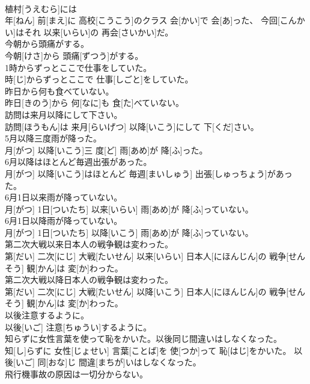 \documentclass[8pt]{extreport}
\begin{document}
\begin{CJK}{UTF8}{min}
\\	植村[うえむら]には 
\\	年[ねん] 前[まえ]に 高校[こうこう]のクラス 会[かい]で 会[あ]った、 今回[こんかい]はそれ 以来[いらい]の 再会[さいかい]だ。
\\	今朝から頭痛がする。	
\\	今朝[けさ]から 頭痛[ずつう]がする。
\\	1時からずっとここで仕事をしていた。	
\\	時[じ]からずっとここで 仕事[しごと]をしていた。
\\	昨日から何も食べていない。	
\\	昨日[きのう]から 何[なに]も 食[た]べていない。
\\	訪問は来月以降にして下さい。	
\\	訪問[ほうもん]は 来月[らいげつ] 以降[いこう]にして 下[くだ]さい。
\\	5月以降三度雨が降った。	
\\	月[がつ] 以降[いこう]三 度[ど] 雨[あめ]が 降[ふ]った。
\\	6月以降はほとんど毎週出張があった。	
\\	月[がつ] 以降[いこう]はほとんど 毎週[まいしゅう] 出張[しゅっちょう]があった。
\\	6月1日以来雨が降っていない。	
\\	月[がつ] 1日[ついたち] 以来[いらい] 雨[あめ]が 降[ふ]っていない。
\\	6月1日以降雨が降っていない。	
\\	月[がつ] 1日[ついたち] 以降[いこう] 雨[あめ]が 降[ふ]っていない。
\\	第二次大戦以来日本人の戦争観は変わった。	
\\	第[だい] 二次[にじ] 大戦[たいせん] 以来[いらい] 日本人[にほんじん]の 戦争[せんそう] 観[かん]は 変[か]わった。
\\	第二次大戦以降日本人の戦争観は変わった。	
\\	第[だい] 二次[にじ] 大戦[たいせん] 以降[いこう] 日本人[にほんじん]の 戦争[せんそう] 観[かん]は 変[か]わった。
\\	以後注意するように。	
\\	以後[いご] 注意[ちゅうい]するように。
\\	知らずに女性言葉を使って恥をかいた。以後同じ間違いはしなくなった。	
\\	知[し]らずに 女性[じょせい] 言葉[ことば]を 使[つか]って 恥[はじ]をかいた。 以後[いご] 同[おな]じ 間違[まちが]いはしなくなった。
\\	飛行機事故の原因は一切分からない。	

\end{CJK}
\end{document}
